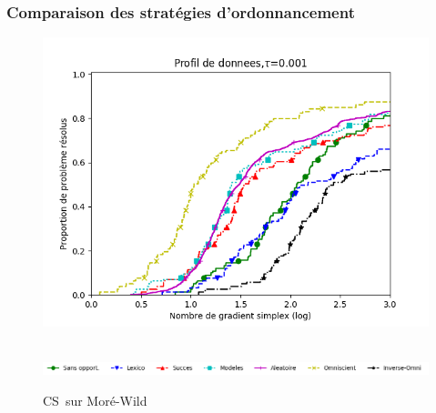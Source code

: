 \documentclass{beamer}
\newcommand\mynum[1]{%
	\usebeamercolor{enumerate item}%
	\tikzset{beameritem/.style={circle,inner sep=0,minimum size=2ex,text=enumerate item.bg,fill=enumerate item.fg,font=\footnotesize}}%
	\tikz[baseline=(n.base)]\node(n)[beameritem]{#1};%
}
\newcommand{\CS}{\textsf{CS}}
\newcommand{\MADS}{\textsf{MADS}}
\begin{document}
\begin{frame}
\frametitle{Comparaison des stratégies d'ordonnancement}
\noindent
	\begin{center}
		\begin{figure}
		\vspace{-1em}
			\begin{minipage}[t]{0.5\linewidth}
				\includegraphics[width=\linewidth]{cog.png}
			\end{minipage}\\
		\includegraphics[width=\linewidth]{legende_mw.png}
		\vspace{-1em}
		\caption{\CS~sur Moré-Wild}
		\vspace{-1.3em}
		\end{figure}
	\end{center}
\end{frame}
\end{document}

